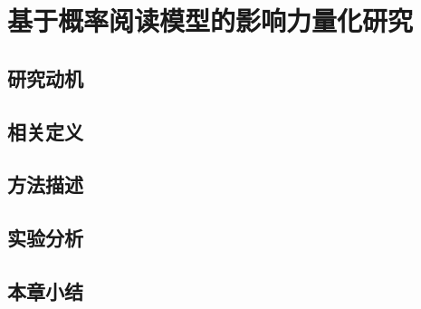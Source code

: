 \chapter{基于概率阅读模型的影响力量化研究}

\section{研究动机}

\section{相关定义}

\section{方法描述}

\section{实验分析}

\section{本章小结}
